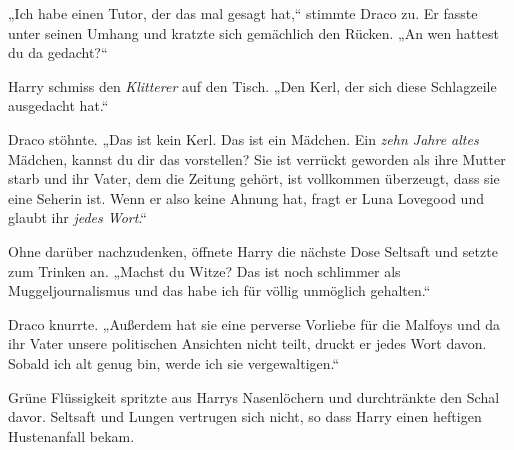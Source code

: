 „Ich habe einen Tutor, der das mal gesagt hat,“ stimmte Draco zu. Er fasste unter seinen Umhang und kratzte sich gemächlich den Rücken. „An wen hattest du da gedacht?“

Harry schmiss den \emph{Klitterer} auf den Tisch. „Den Kerl, der sich diese Schlagzeile ausgedacht hat.“

Draco stöhnte. „Das ist kein Kerl. Das ist ein Mädchen. Ein \emph{zehn Jahre altes} Mädchen, kannst du dir das vorstellen? Sie ist verrückt geworden als ihre Mutter starb und ihr Vater, dem die Zeitung gehört, ist vollkommen überzeugt, dass sie eine Seherin ist. Wenn er also keine Ahnung hat, fragt er Luna Lovegood und glaubt ihr \emph{jedes Wort}.“

Ohne darüber nachzudenken, öffnete Harry die nächste Dose Seltsaft und setzte zum Trinken an. „Machst du Witze? Das ist noch schlimmer als Muggeljournalismus und das habe ich für völlig unmöglich gehalten.“

Draco knurrte. „Außerdem hat sie eine perverse Vorliebe für die Malfoys und da ihr Vater unsere politischen Ansichten nicht teilt, druckt er jedes Wort davon. Sobald ich alt genug bin, werde ich sie vergewaltigen.“

Grüne Flüssigkeit spritzte aus Harrys Nasenlöchern und durchtränkte den Schal davor. Seltsaft und Lungen vertrugen sich nicht, so dass Harry einen heftigen Hustenanfall bekam.

